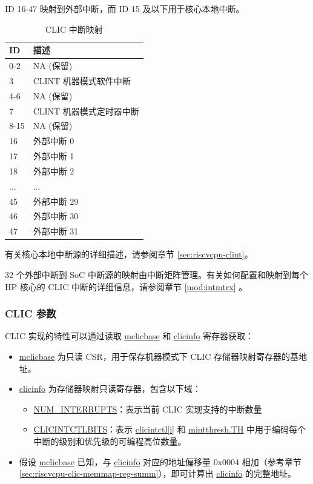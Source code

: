 \documentclass[main\_\_CN.tex]{subfiles}
\begin{document}
ID 16-47 映射到外部中断，而 ID 15 及以下用于核心本地中断。

\begin{longtable}{ | l | l | }
\caption{CLIC 中断映射}
\label{tab:riscvcpu-clic-intmap-table}
\\ \hline
\rowcolor{lightgray}
ID & 描述 \\ \hline
0-2 & NA (保留) \\ \hline
3 & CLINT 机器模式软件中断 \\ \hline
4-6 & NA (保留) \\ \hline
7 & CLINT 机器模式定时器中断 \\ \hline
8-15 & NA (保留) \\ \hline
16 & 外部中断 0 \\ \hline
17 & 外部中断 1 \\ \hline
18 & 外部中断 2 \\ \hline
... & ... \\ \hline
45 & 外部中断 29 \\ \hline
46 & 外部中断 30 \\ \hline
47 & 外部中断 31 \\ \hline
\end{longtable}

有关核心本地中断源的详细描述，请参阅章节 \ref{sec:riscvcpu-clint}。

32 个外部中断到 SoC 中断源的映射由中断矩阵管理。有关如何配置和映射到每个 HP 核心的 CLIC 中断的详细信息，请参阅章节 \ref{mod:intmtrx} \textit{}。

\hypertarget{riscvcpu-clic-params}{}
\subsubsection{CLIC 参数}
\label{sec:riscvcpu-clic-params}

CLIC 实现的特性可以通过读取 \hyperref[regdesc:MCLICBASE_REG]{mclicbase} 和 \hyperref[regdesc:CLICINFO_REG]{clicinfo} 寄存器获取：

\begin{itemize}
    \item \hyperref[regdesc:MCLICBASE_REG]{mclicbase} 为只读 CSR，用于保存机器模式下 CLIC 存储器映射寄存器的基地址。
    \item \hyperref[regdesc:CLICINFO_REG]{clicinfo} 为存储器映射只读寄存器，包含以下域：
    \begin{itemize}
        \item \hyperref[fielddesc:CLICINFO_NUM_INTERRUPTS]{NUM\_INTERRUPTS}：表示当前 CLIC 实现支持的中断数量
        \item \hyperref[fielddesc:CLICINFO_CLICINTCTLBITS]{CLICINTCTLBITS}：表示 \hyperref[regdesc:MCLICINTCTL_REG_i]{clicintctl[i]} 和 \hyperref[fielddesc:MINTTHRESH_TH]{{mintthresh.TH}} 中用于编码每个中断的级别和优先级的可编程高位数量。
    \end{itemize}
    \item 假设 \hyperref[fielddesc:MCLICBASE]{mclicbase} 已知，与 \hyperref[regdesc:CLICINFO_REG]{clicinfo} 对应的地址偏移量 0x0004 相加（参考章节 \ref{sec:riscvcpu-clic-memmap-reg-summ}），即可计算出 \hyperref[regdesc:CLICINFO_REG]{clicinfo} 的完整地址。
\end{itemize}
\end{document}
